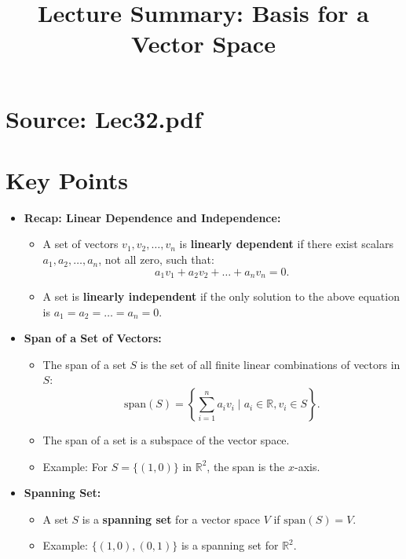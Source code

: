 \documentclass{article}
\title{Lecture Summary: Basis for a Vector Space}
\author{}
\date{}
\begin{document}
\maketitle

\section*{Source: Lec32.pdf}

\section*{Key Points}

\begin{itemize}
  \item \textbf{Recap: Linear Dependence and Independence:}
    \begin{itemize}
      \item A set of vectors $v_1, v_2, \dots, v_n$ is \textbf{linearly dependent} if there exist scalars $a_1, a_2, \dots, a_n$, not all zero, such that:
        \[
          a_1 v_1 + a_2 v_2 + \dots + a_n v_n = 0.
        \]
      \item A set is \textbf{linearly independent} if the only solution to the above equation is $a_1 = a_2 = \dots = a_n = 0$.
    \end{itemize}

  \item \textbf{Span of a Set of Vectors:}
    \begin{itemize}
      \item The span of a set $S$ is the set of all finite linear combinations of vectors in $S$:
        \[
          \text{span}(S) = \left\{ \sum_{i=1}^n a_i v_i \mid a_i \in \mathbb{R}, v_i \in S \right\}.
        \]
      \item The span of a set is a subspace of the vector space.
      \item Example: For $S = \{(1, 0)\}$ in $\mathbb{R}^2$, the span is the $x$-axis.
    \end{itemize}

  \item \textbf{Spanning Set:}
    \begin{itemize}
      \item A set $S$ is a \textbf{spanning set} for a vector space $V$ if $\text{span}(S) = V$.
      \item Example: $\{(1, 0), (0, 1)\}$ is a spanning set for $\mathbb{R}^2$.
    \end{itemize}


\end{itemize}
\end{document}
